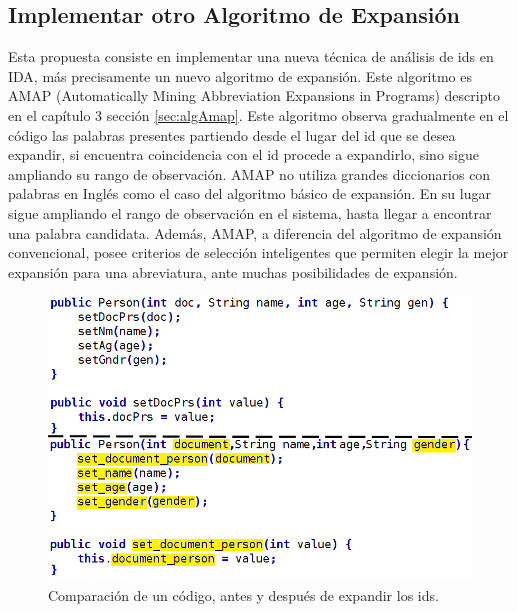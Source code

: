  
\subsection{Implementar otro Algoritmo de Expansión}

Esta propuesta consiste en implementar una nueva técnica de análisis de ids en IDA, más precisamente un nuevo algoritmo de expansión. Este algoritmo es AMAP (Automatically Mining Abbreviation Expansions in Programs) descripto en el capítulo 3 sección \ref{sec:algAmap}. Este algoritmo observa gradualmente en el código las palabras presentes partiendo desde el lugar del id que se desea expandir, si encuentra coincidencia con el id procede a expandirlo, sino sigue ampliando su rango de observación. AMAP no utiliza grandes diccionarios con palabras en Inglés como el caso del algoritmo básico de expansión. En su lugar sigue ampliando el rango de observación en el sistema, hasta llegar a encontrar una palabra candidata.
Además, AMAP, a diferencia del algoritmo de expansión convencional, posee criterios de selección inteligentes que permiten elegir la mejor expansión para una abreviatura, ante muchas posibilidades de expansión.

\begin{figure}[t] %
\centerline{%
\includegraphics[scale= 0.52]{./cap5/cod.png}
}
\caption{Comparación de un código, antes y después de expandir los ids.}
\label{cod}
\end{figure}


